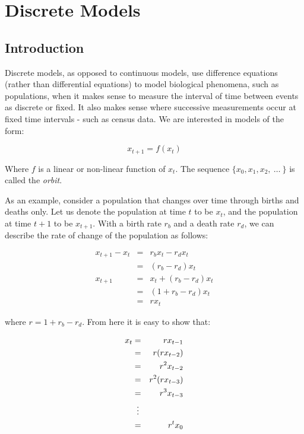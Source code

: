 \documentclass{report}
\begin{document}
\chapter{Discrete Models}




\section{Introduction}

Discrete models, as opposed to continuous models, use difference equations (rather than differential equations) to
model biological phenomena, such as populations, when it makes sense to measure the interval of time between events
as discrete or fixed. It also makes sense where successive measurements occur at fixed time intervals - such as
census data. We are interested in models of the form: \bigskip

\[
	x_{t + 1} = f(x_t)
\]\medskip

Where $f$ is a linear or non-linear function of $x_t$. The sequence $\{x_0, x_1, x_2, \ \ldots \ \}$ is called
the \emph{orbit}. \bigskip

As an example, consider a population that changes over time through births and deaths only. Let us denote the population
at time $t$ to be $x_t$, and the population at time $t + 1$ to be $x_{t + 1}$. With a birth rate $r_b$ and a death rate
$r_d$, we can describe the rate of change of the population as follows: \bigskip

\begin{eqnarray*}
  x_{t + 1} - x_t & = & r_b x_t - r_d x_t \\
                  & = & (r_b - r_d) x_t \\
        x_{t + 1} & = & x_t + (r_b - r_d) x_t \\
                  & = & (1 + r_b - r_d) x_t \\
                  & = & r x_t
\end{eqnarray*}\medskip

where $r = 1 + r_b - r_d$. From here it is easy to show that: \bigskip

\begin{eqnarray*}
    x_t & = & r x_{t - 1} \\
        & = & r (r x_{t - 2}) \\
        & = & r^2 x_{t - 2} \\
        & = & r^2 (r x_{t - 3}) \\
        & = & r^3 x_{t - 3} \\
        & \mathrel{\makebox[\widthof{=}]{\vdots}} \\
        & = & r^t x_0
\end{eqnarray*}\medskip
\end{document}

